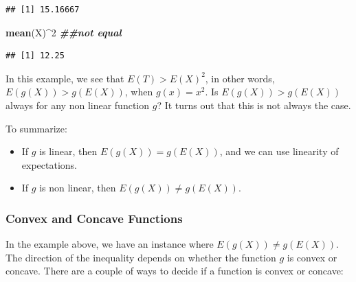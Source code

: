 \documentclass[
]{book}
\newenvironment{Shaded}{\begin{snugshade}}{\end{snugshade}}
\newcommand{\DecValTok}[1]{\textcolor[rgb]{0.00,0.00,0.81}{#1}}
\newcommand{\DocumentationTok}[1]{\textcolor[rgb]{0.56,0.35,0.01}{\textbf{\textit{#1}}}}
\newcommand{\FunctionTok}[1]{\textcolor[rgb]{0.13,0.29,0.53}{\textbf{#1}}}
\newcommand{\NormalTok}[1]{#1}
\newcommand{\SpecialCharTok}[1]{\textcolor[rgb]{0.81,0.36,0.00}{\textbf{#1}}}
\providecommand{\tightlist}{%
  \setlength{\itemsep}{0pt}\setlength{\parskip}{0pt}}
\begin{document}
\begin{verbatim}
## [1] 15.16667
\end{verbatim}

\begin{Shaded}
\begin{Highlighting}[]
\FunctionTok{mean}\NormalTok{(X)}\SpecialCharTok{\^{}}\DecValTok{2} \DocumentationTok{\#\#not equal}
\end{Highlighting}
\end{Shaded}

\begin{verbatim}
## [1] 12.25
\end{verbatim}

In this example, we see that \(E(T) > E(X)^2\), in other words, \(E(g(X)) > g(E(X))\), when \(g(x) = x^2\). Is \(E(g(X)) > g(E(X))\) always for any non linear function \(g\)? It turns out that this is not always the case.

To summarize:

\begin{itemize}
\tightlist
\item
  If \(g\) is linear, then \(E(g(X)) = g(E(X))\), and we can use linearity of expectations.
\item
  If \(g\) is non linear, then \(E(g(X)) \neq g(E(X))\).
\end{itemize}

\subsubsection{Convex and Concave Functions}\label{convex-and-concave-functions}

In the example above, we have an instance where \(E(g(X)) \neq g(E(X))\). The direction of the inequality depends on whether the function \(g\) is convex or concave. There are a couple of ways to decide if a function is convex or concave:
\end{document}
